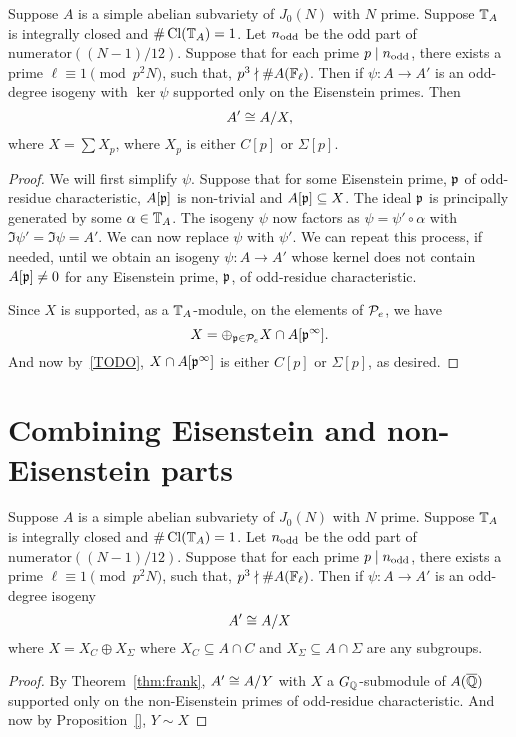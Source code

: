\documentclass[thesis.tex]{subfiles}
\begin{document}
\begin{corollary}
    \label{cor:eisenstein}
    Suppose $A$ is a simple abelian subvariety of $J_0(N)$ with $N$ prime.
    Suppose $\TT_A$ is integrally closed and $\#\Cl(\TT_A)=1$. Let $n_\odd$ be
    the odd part of $\mathrm{numerator}((N-1)/12)$. Suppose that for each prime
    $p\mid n_\odd$, there exists a prime $\ell\equiv 1 \pmod{p^2N}$, such that,
    $p^3\nmid \#A(\F_\ell)$. Then if $\psi:A\to A'$ is an odd-degree isogeny
    with $\ker\psi$ supported only on the Eisenstein primes. Then
    \[
        A'\isom A/X,
    \]
    where $X=\sum X_p$, where $X_p$ is either $C[p]$ or $\Sigma[p]$.
\end{corollary}
\begin{proof}
    We will first simplify $\psi$. Suppose that for some Eisenstein prime, $\p$
    of odd-residue characteristic, $A[\p]$ is non-trivial and $A[\p]\subseteq
    X$. The ideal $\p$ is principally generated by some $\alpha\in \TT_A$. The
    isogeny $\psi$ now factors as $\psi=\psi'\circ \alpha$ with $\Im \psi'=\Im
    \psi = A'$. We can now replace $\psi$ with $\psi'$. We can repeat this
    process, if needed, until we obtain an isogeny $\psi:A\to A'$ whose kernel
    does not contain $A[\p]\neq 0$ for any Eisenstein prime, $\p$, of odd-residue
    characteristic.

    Since $X$ is supported, as a $\TT_A$-module, on the elements of $\P_e$, we
    have
    \[
        X = \oplus_{\p\in \P_e} X\cap A[\p^\infty].
    \]
    And now by~\ref{TODO}, $X\cap A[\p^\infty]$ is either $C[p]$ or
    $\Sigma[p]$, as desired.
\end{proof}


\section{Combining Eisenstein and non-Eisenstein parts}%
\label{sec:combining_eisenstein_and_non_eisenstein_parts}

\begin{theorem}
    Suppose $A$ is a simple abelian subvariety of $J_0(N)$ with $N$ prime.
    Suppose $\TT_A$ is integrally closed and $\#\Cl(\TT_A)=1$. Let $n_\odd$ be
    the odd part of $\mathrm{numerator}((N-1)/12)$. Suppose that for each prime
    $p\mid n_\odd$, there exists a prime $\ell\equiv 1 \pmod{p^2N}$, such that,
    $p^3\nmid \#A(\F_\ell)$. Then if $\psi:A\to A'$ is an odd-degree isogeny
    \[
        A'\isom A/X
    \]
    where $X=X_C\oplus X_\Sigma$ where $X_C\subseteq A\cap C$ and $X_\Sigma
    \subseteq A\cap \Sigma$ are any subgroups.
\end{theorem}
\begin{proof}
    By Theorem~\ref{thm:frank}, $A'\isom A/Y$ with $X$ a $G_\QQ$-submodule of
    $A(\QQbar)$ supported only on the non-Eisenstein primes of odd-residue
    characteristic. And now by Proposition~\ref{}, $Y\sim X$
\end{proof}
\end{document}
